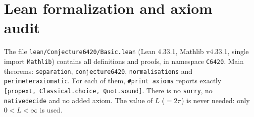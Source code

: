 \documentclass[11pt]{article}
\theoremstyle{definition}
\theoremstyle{remark}
\renewcommand{\_}{\oldus\allowbreak}
\begin{document}
\section{Lean formalization and axiom audit}

The file \texttt{lean/Conjecture6420/Basic.lean} (Lean 4.33.1, Mathlib v4.33.1, single import
\texttt{Mathlib}) contains all definitions and proofs, in namespace \texttt{C6420}. Main
theorems: \texttt{separation}, \texttt{conjecture6420}, \texttt{normalisations} and
\texttt{perimeter\_axiomatic}. For each of them, \texttt{\#print axioms} reports exactly
\texttt{[propext, Classical.choice, Quot.sound]}. There is no \texttt{sorry}, no
\texttt{native\_decide} and no added axiom. The value of $L$ ($=2\pi$) is never needed: only
$0<L<\infty$ is used.
\end{document}

